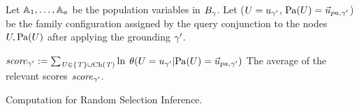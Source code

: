 \documentclass[twoside,11pt]{article}
\begin{document}
\begin{algorithm}[htbp]

{}
\begin{algorithmic}[1]
\STATE Let $\mathbb{A}_{1},\ldots,\mathbb{A}_{a}$ be the population variables in $B_\gamma$.
\STATE Let ($U = u_{\gamma'}$, $\Pa{\UT} = \GroundPrange{U}$) be the family configuration assigned by the query conjunction to the nodes $U,\mathrm{Pa}(U)$ after applying the grounding $\gamma'$.
\ENDFOR
{}



\STATE $\it{score}_{\gamma'} := \sum_{U \in \{T\} \cup \mathrm{Ch}(T)} \ln$ $\cprob{\UT = \UV_{\grounding'}}{\Pa{\UT} = \GroundPrange{U}}$
\ENDIF
\ENDFOR
\STATE \Return The average of the relevant scores $\it{score}_{\gamma'}$.
\end{algorithmic}
\caption{Computation for Random Selection Inference.}
\label{alg:random-ground}
\end{algorithm}
\end{document}
